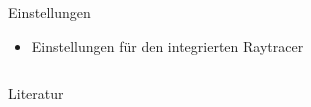 \documentclass[final,hyperref={pdfpagelabels=false}]{beamer}
\begin{document}
\begin{frame}[t]
\begin{columns}[t]
\begin{column}{.465\textwidth}
\begin{block}{Einstellungen}
   
   
   
   
   \begin{itemize}
   \item Einstellungen für den integrierten Raytracer
   \end{itemize}
   
     
   
   
\end{block}


\end{column} %



\begin{column}{.025\textwidth}\end{column} %

\end{columns} %








\nocite{*}

\begin{block}{Literatur}
  
  \nocite{pries:19}
  
\end{block}

\end{frame} %
\end{document}
